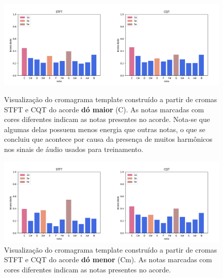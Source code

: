     \begin{figure}[htb]
        \begin{center}
            \includegraphics[width=16cm]{figuras/mayor_C.png}
            \caption{\label{fig:exp:template_c}Visualização do cromagrama template construído a partir de cromas STFT e CQT do acorde \textbf{dó maior} (C). As notas marcadas com cores diferentes indicam as notas presentes no acorde. Nota-se que algumas delas possuem menos energia que outras notas, o que se concluiu que acontece por causa da presença de muitos harmônicos nos sinais de áudio usados para treinamento.}
            
            \includegraphics[width=16cm]{figuras/minor_C.png}
            \caption{\label{fig:exp:template_cm}Visualização do cromagrama template construído a partir de cromas STFT e CQT do acorde \textbf{dó menor} (Cm). As notas marcadas com cores diferentes indicam as notas presentes no acorde.}
        \end{center}
    \end{figure}
    
